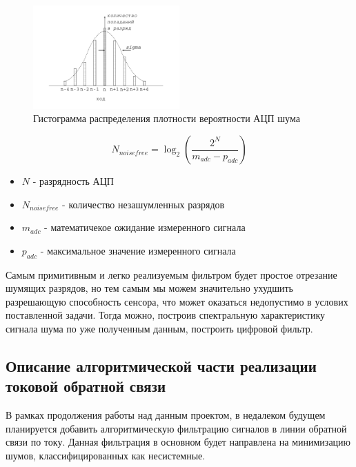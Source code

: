 \begin{figure}[!ht]
    \centering
    \includegraphics[width=0.5\textwidth, keepaspectratio, clip=true, trim=5mm 10mm 5mm 5mm]
                    {./src/pictures/adc_noise_probabilistic_estimate}
    \caption{Гистограмма распределения плотности вероятности АЦП шума}
    \label{picAdcNoiseProbabilisticEstimate}
\end{figure}

\begin{equation}
    \label{eq_noise_free_code_resolution}
    N_{noise free} = \log_{2}{( \frac{ 2^{N} }{ m_{adc} - p_{adc} } )}
\end{equation}

\begin{itemize}
    \item $ N $ - разрядность АЦП
    \item $ N_{noise free} $ - количество незашумленных разрядов
    \item $ m_{adc} $ - математичекое ожидание измеренного сигнала
    \item $ p_{adc} $ - максимальное значение измеренного сигнала
\end{itemize}

Самым примитивным и легко реализуемым фильтром будет простое отрезание шумящих разрядов,
но тем самым мы можем значительно ухудшить разрешающую способность сенсора, что может
оказаться недопустимо в услових поставленной задачи. Тогда можно, построив спектральную
характеристику сигнала шума по уже полученным данным, построить цифровой фильтр.

\subsection{ Описание алгоритмической части реализации токовой обратной связи }

В рамках продолжения работы над данным проектом, в недалеком будущем планируется добавить
алгоритмическую фильтрацию сигналов в линии обратной связи по току. Данная фильтрация в
основном будет направлена на минимизацию шумов, классифицированных как несистемные.

\endinput
